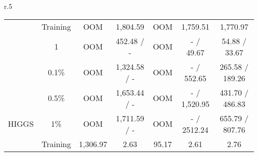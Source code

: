 \begin{wraptable}[23]{r}{.5\textwidth}
{\begin{tabular}{ccccccc}
                                                     & Training                        & OOM                                                                 & 1,804.59                                                         & OOM                                                                   & 1,759.51                                                              & 1,770.97                           \\
                                                     & 1                               & OOM                                                                 & 452.48 / -                                                       & OOM                                                                   & - / 49.67                                                             & 54.88 / 33.67                      \\
                                                     & 0.1\%                           & OOM                                                                 & 1,324.58 / -                                                     & OOM                                                                   & - / 552.65                                                            & 265.58 / 189.26                    \\
                                                     & 0.5\%                           & OOM                                                                 & 1,653.44 / -                                                     & OOM                                                                   & - / 1,520.95                                                          & 431.70 / 486.83                    \\
\multirow{-5}{*}{HIGGS}                              & 1\%                             & OOM                                                                 & 1,711.59 / -                                                     & OOM                                                                   & - / 2512.24                                                           & 655.79 / 807.76                    \\\midrule
                                                     & Training                        & 1,306.97                                                            & 2.63                                                             & 95.17                                                                 & 2.61                                                                  & 2.76                               \\

\end{tabular}}
\end{wraptable}
